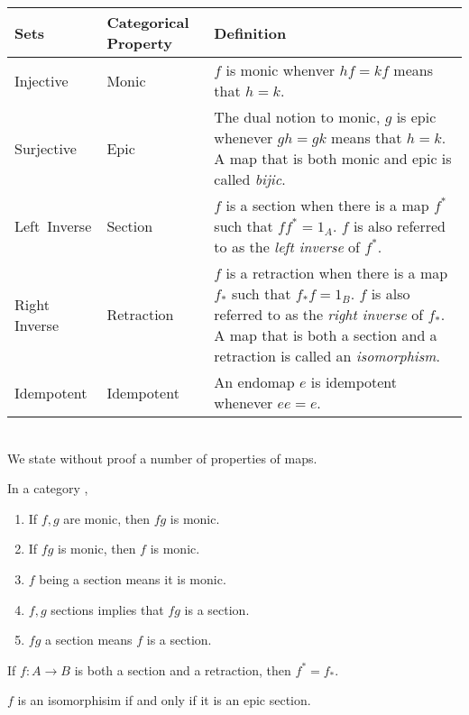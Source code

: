 \begin{tabular}{|p{1in}p{1in}p{3.73in}|}
\hline
{\bf Sets} & {\bf Categorical Property} & {\bf Definition}\\
\hline
\hline
Injective & Monic & $f$ is monic whenver $h f = k f$ means that $h = k$.\\
\hline
Surjective & Epic & The dual notion to monic, $g$ is epic whenever $g h = g k$ means that $h = k$.
A map that is both monic and epic is called \emph{bijic}.\\
\hline
Left~Inverse & Section & $f$ is a section when there is a map $f^*$ such that $f f^* = 1_A$. $f$
is also referred to as the \emph{left inverse} of $f^*$.\\
\hline
Right Inverse & Retraction & $f$ is a retraction when there is a map $f_*$ such that $f_* f = 1_B$.
$f$ is also referred to as the \emph{right inverse} of $f_*$. A map that is both a section and a
retraction is called an \emph{isomorphism}.\\
\hline
Idempotent & Idempotent & An endomap $e$ is idempotent whenever $e e = e$.\\
\hline
\end{tabular}\\[14pt]

We state without proof a number of properties of maps.

\begin{lemma}\label{lem:categorical_properties_of_maps}
  In a category \C,
  \begin{enumerate}[{(}i{)}]
    \item If $f,g$ are monic, then $f g$ is monic.
    \item If $f g$ is monic, then $f$ is monic.
    \item $f$ being a section means it is monic.
    \item $f, g$ sections implies that $f g$ is a section.
    \item $f g$ a section means $f$ is a section.
  \end{enumerate}
\end{lemma}


\begin{lemma}\label{lem:categorical_inverses_are_unique}
  If $f:A \to B$ is both a section and a retraction, then $f^* = f_*$.
\end{lemma}

\begin{lemma}\label{lem:categorical_iso_is_epic_section}
  $f$ is an isomorphisim if and only if it is an epic section.
\end{lemma}

